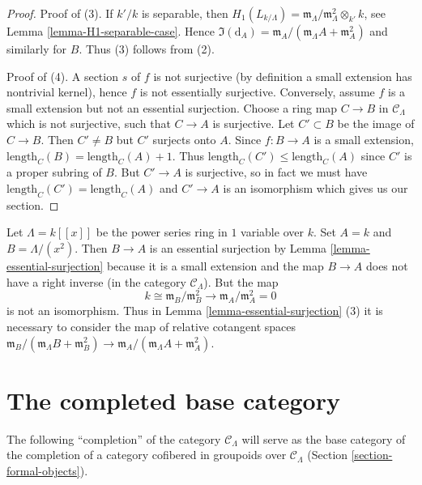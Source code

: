 \begin{proof}
\medskip\noindent
Proof of (3). If $k'/k$ is separable, then
$H_1(L_{k/\Lambda}) =
\mathfrak m_\Lambda/\mathfrak m_\Lambda^2 \otimes_{k'} k$, see
Lemma \ref{lemma-H1-separable-case}.
Hence $\Im(\text{d}_A) =
\mathfrak m_A/(\mathfrak m_\Lambda A + \mathfrak m_A^2)$
and similarly for $B$. Thus (3) follows from (2).

\medskip\noindent
Proof of (4). A section $s$ of $f$ is not surjective (by definition a
small extension has nontrivial kernel), hence $f$ is not essentially
surjective. Conversely, assume $f$ is a small extension but not an
essential surjection. Choose a ring map $C \to B$ in $\mathcal{C}_\Lambda$
which is not surjective, such that $C \to A$ is surjective. Let
$C' \subset B$ be the image of $C \to B$. Then $C' \not = B$ but
$C'$ surjects onto $A$. Since $f : B \to A$ is a small extension,
$\text{length}_C(B) = \text{length}_C(A) + 1$. Thus
$\text{length}_C(C') \leq \text{length}_C(A)$ since
$C'$ is a proper subring of $B$. But $C' \to A$ is surjective, so in
fact we must have $\text{length}_C(C') = \text{length}_C(A)$ and
$C' \to A$ is an isomorphism which gives us our section.
\end{proof}

\begin{example}
\label{example-essential-surjection}
Let $\Lambda = k[[x]]$ be the power series ring in $1$ variable over $k$.
Set $A = k$ and $B = \Lambda/(x^2)$. Then $B \to A$ is an essential
surjection by
Lemma \ref{lemma-essential-surjection}
because it is a small extension and the map $B \to A$ does not have a
right inverse (in the category $\mathcal{C}_\Lambda$). But the map
$$
k \cong \mathfrak m_B/\mathfrak m_B^2
\longrightarrow
\mathfrak m_A/\mathfrak m_A^2 = 0
$$
is not an isomorphism. Thus in
Lemma \ref{lemma-essential-surjection} (3)
it is necessary to consider the map of relative cotangent spaces
$\mathfrak m_B/(\mathfrak m_\Lambda B + \mathfrak m_B^2) \to
\mathfrak m_A/(\mathfrak m_\Lambda A + \mathfrak m_A^2)$.
\end{example}







\section{The completed base category}
\label{section-category-completion-CLambda}

\noindent
The following ``completion'' of the category $\mathcal{C}_\Lambda$ will serve
as the base category of the completion of a category cofibered in groupoids
over $\mathcal{C}_\Lambda$
(Section \ref{section-formal-objects}).

